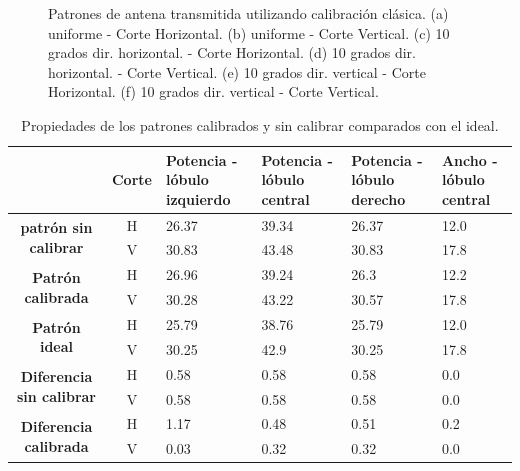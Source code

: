 \begin{figure}[H]
		\caption{Patrones de antena transmitida utilizando calibración clásica. (a) uniforme - Corte Horizontal. (b) uniforme - 
			Corte Vertical. (c) 10 grados dir. horizontal. - Corte Horizontal. (d) 10 grados dir. horizontal. - Corte Vertical. (e) 10 
			grados dir. vertical - Corte Horizontal. (f) 10 grados dir. vertical - Corte Vertical.}
	\label{fig:wallErrClassicalPat}
\end{figure}

\begin{table}[H]
  \footnotesize
  \centering
  \begin{tabular}{|c|c|p{2cm}|p{2cm}|p{2cm}|p{2cm}|}
    \cline{2-6}
    \multicolumn{1}{c|}{} & \textbf{Corte} & \textbf{Potencia - lóbulo izquierdo} & \textbf{Potencia - lóbulo central} &
    \textbf{Potencia - lóbulo derecho} & \textbf{Ancho - lóbulo central} \tabularnewline\hline
    \multirow{2}{*}{\textbf{patrón sin calibrar}} & H & 26.37 & 39.34 & 26.37 & 12.0 \tabularnewline\cline{2-6}
     & V & 30.83 & 43.48 & 30.83 & 17.8 \tabularnewline\hline
    \multirow{2}{*}{\textbf{Patrón calibrada}} & H & 26.96 & 39.24 & 26.3 & 12.2 \tabularnewline\cline{2-6}
     & V & 30.28 & 43.22 & 30.57 & 17.8 \tabularnewline\hline
    \multirow{2}{*}{\textbf{Patrón ideal}} & H & 25.79 & 38.76 & 25.79 & 12.0 \tabularnewline\cline{2-6}
     & V & 30.25 & 42.9 & 30.25 & 17.8 \tabularnewline\hline
    \multirow{2}{*}{\textbf{Diferencia sin calibrar}} & H & 0.58 & 0.58 & 0.58 & 0.0\tabularnewline\cline{2-6}
     & V & 0.58 & 0.58 & 0.58 & 0.0 \tabularnewline\hline
    \multirow{2}{*}{\textbf{Diferencia calibrada}} & H & 1.17 & 0.48 & 0.51 & 0.2 \tabularnewline\cline{2-6}
     & V & 0.03 & 0.32 & 0.32 & 0.0 \tabularnewline\hline
  \end{tabular}
  \caption{Propiedades de los patrones calibrados y sin calibrar comparados con el ideal.}
  \label{tab:wallErrClassical10degRow}
\end{table}
